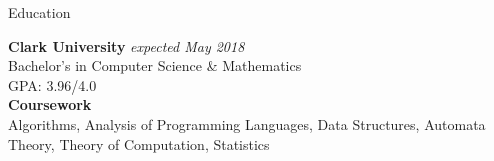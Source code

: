\documentclass{resume} %
\begin{document}

\begin{rSection}{Education}

\begin{multicols}{2}

{\bf Clark University} \hfill {\em expected May 2018} \\ 
Bachelor's in Computer Science \& Mathematics \\
GPA: 3.96/4.0  \smallskip \\
\textbf{Coursework} \\ Algorithms, Analysis of Programming Languages, Data Structures, Automata Theory, Theory of Computation, Statistics

\end{multicols}

\end{rSection}

\end{document}
